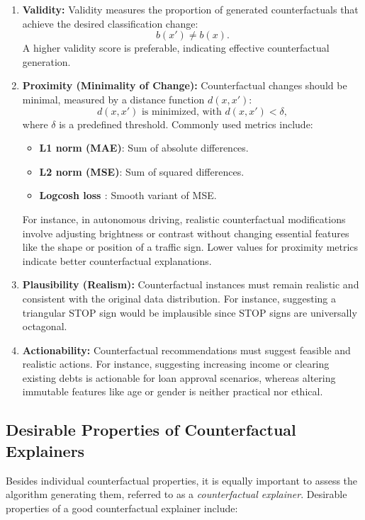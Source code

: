 \begin{enumerate}
    \item \textbf{Validity:}  
    Validity measures the proportion of generated counterfactuals that achieve the desired classification change:
    \begin{equation}
        b(x') \neq b(x).
    \end{equation}
    A higher validity score is preferable, indicating effective counterfactual generation.

    \item \textbf{Proximity (Minimality of Change):}  
    Counterfactual changes should be minimal, measured by a distance function \( d(x, x') \):
    \begin{equation}
        d(x, x') \text{ is minimized, with } d(x,x') < \delta,
    \end{equation}
    where \( \delta \) is a predefined threshold. Commonly used metrics include:
    \begin{itemize}
        \item \textbf{L1 norm (MAE)}: Sum of absolute differences.
        \item \textbf{L2 norm (MSE)}: Sum of squared differences.
        \item \textbf{Logcosh loss \cite{chen2019log}}: Smooth variant of MSE.
    \end{itemize}

    For instance, in autonomous driving, realistic counterfactual modifications involve adjusting brightness or contrast without changing essential features like the shape or position of a traffic sign. Lower values for proximity metrics indicate better counterfactual explanations.

    \item \textbf{Plausibility (Realism):}  
    Counterfactual instances must remain realistic and consistent with the original data distribution. For instance, suggesting a triangular STOP sign would be implausible since STOP signs are universally octagonal.

    \item \textbf{Actionability:}  
    Counterfactual recommendations must suggest feasible and realistic actions. For instance, suggesting increasing income or clearing existing debts is actionable for loan approval scenarios, whereas altering immutable features like age or gender is neither practical nor ethical.
\end{enumerate}

\subsection{Desirable Properties of Counterfactual Explainers}
Besides individual counterfactual properties, it is equally important to assess the algorithm generating them, referred to as a \textit{counterfactual explainer}. Desirable properties of a good counterfactual explainer include:

